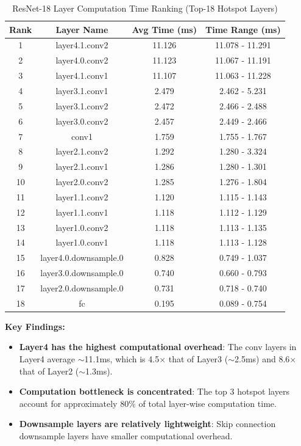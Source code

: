\documentclass[12pt,a4paper]{report}
\begin{document}
\begin{table}[htbp]
    \centering
    \caption{ResNet-18 Layer Computation Time Ranking (Top-18 Hotspot Layers)}
    \begin{tabular}{cccc}
        \toprule
        \textbf{Rank} & \textbf{Layer Name} & \textbf{Avg Time (ms)} & \textbf{Time Range (ms)} \\
        \midrule
        1 & layer4.1.conv2 & 11.126 & 11.078 - 11.291 \\
        2 & layer4.0.conv2 & 11.123 & 11.067 - 11.191 \\
        3 & layer4.1.conv1 & 11.107 & 11.063 - 11.228 \\
        4 & layer3.1.conv1 & 2.479 & 2.462 - 5.231 \\
        5 & layer3.1.conv2 & 2.472 & 2.466 - 2.488 \\
        6 & layer3.0.conv2 & 2.457 & 2.449 - 2.466 \\
        7 & conv1 & 1.759 & 1.755 - 1.767 \\
        8 & layer2.1.conv2 & 1.292 & 1.280 - 3.324 \\
        9 & layer2.1.conv1 & 1.286 & 1.280 - 1.301 \\
        10 & layer2.0.conv2 & 1.285 & 1.276 - 1.804 \\
        11 & layer1.1.conv2 & 1.120 & 1.115 - 1.143 \\
        12 & layer1.1.conv1 & 1.118 & 1.112 - 1.129 \\
        13 & layer1.0.conv2 & 1.118 & 1.113 - 1.135 \\
        14 & layer1.0.conv1 & 1.118 & 1.113 - 1.128 \\
        15 & layer4.0.downsample.0 & 0.828 & 0.749 - 1.037 \\
        16 & layer3.0.downsample.0 & 0.740 & 0.660 - 0.793 \\
        17 & layer2.0.downsample.0 & 0.731 & 0.718 - 0.740 \\
        18 & fc & 0.195 & 0.089 - 0.754 \\
        \bottomrule
    \end{tabular}
    \label{tab:layer_time}
\end{table}

\bigskip
\noindent \textbf{Key Findings:}

\begin{itemize}
    \item \textbf{Layer4 has the highest computational overhead}: The conv layers in Layer4 average $\sim$11.1ms, which is 4.5$\times$ that of Layer3 ($\sim$2.5ms) and 8.6$\times$ that of Layer2 ($\sim$1.3ms).
    
    \item \textbf{Computation bottleneck is concentrated}: The top 3 hotspot layers account for approximately 80\% of total layer-wise computation time.
    
    \item \textbf{Downsample layers are relatively lightweight}: Skip connection downsample layers have smaller computational overhead.
\end{itemize}
\end{document}
